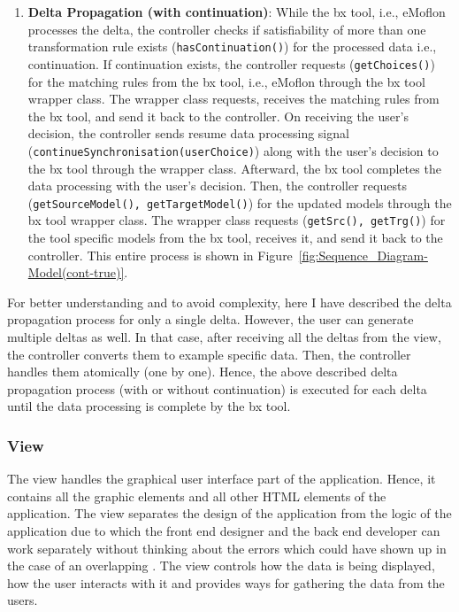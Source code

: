 \begin{enumerate}
	\item {\textbf{Delta Propagation (with continuation)}: While the bx tool, i.e., eMoflon processes the delta, the controller checks if satisfiability of more than one transformation rule exists (\texttt{hasContinuation()}) for the processed data i.e., continuation. If continuation exists, the controller requests (\texttt{getChoices()}) for the matching rules from the bx tool, i.e., eMoflon through the bx tool wrapper class. The wrapper class requests, receives the matching rules from the bx tool, and send it back to the controller. On receiving the user's decision, the controller sends resume data processing signal (\texttt{continueSynchronisation(userChoice)}) along with the user's decision to the bx tool through the wrapper class. Afterward, the bx tool completes the data processing with the user's decision. Then, the controller requests (\texttt{getSourceModel(), getTargetModel()}) for the updated models through the bx tool wrapper class. The wrapper class requests (\texttt{getSrc(), getTrg()}) for the tool specific models from the bx tool, receives it, and send it back to the controller. This entire process is shown in Figure~\ref{fig:Sequence_Diagram-Model(cont-true)}.}
\end{enumerate}

For better understanding and to avoid complexity, here I have described the delta propagation process for only a single delta. However, the user can generate multiple deltas as well. In that case, after receiving all the deltas from the view, the controller converts them to example specific data. Then, the controller handles them atomically (one by one). Hence, the above described delta propagation process (with or without continuation) is executed for each delta until the data processing is complete by the bx tool. 

\subsubsection{View}\label{subsubsec:design_view}
The view handles the graphical user interface part of the application. Hence, it contains all the graphic elements and all other HTML elements of the application. The view separates the design of the application from the logic of the application due to which the front end designer and the back end developer can work separately without thinking about the errors which could have shown up in the case of an overlapping \cite{designpattern-headfirst} \cite{mvc-arch}. The view controls how the data is being displayed, how the user interacts with it and provides ways for gathering the data from the users.

